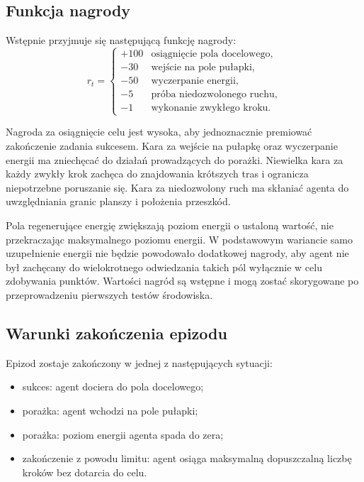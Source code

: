 \documentclass[12pt]{article}
\begin{document}
\subsection{Funkcja nagrody}

Wstępnie przyjmuje się następującą funkcję nagrody:
\[
r_t =
\begin{cases}
+100 & \text{osiągnięcie pola docelowego},\\
-30 & \text{wejście na pole pułapki},\\
-50 & \text{wyczerpanie energii},\\
-5 & \text{próba niedozwolonego ruchu},\\
-1 & \text{wykonanie zwykłego kroku}.
\end{cases}
\]

Nagroda za osiągnięcie celu jest wysoka, aby jednoznacznie premiować zakończenie zadania sukcesem. Kara za wejście na pułapkę oraz wyczerpanie energii ma zniechęcać do działań prowadzących do porażki. Niewielka kara za każdy zwykły krok zachęca do znajdowania krótszych tras i ogranicza niepotrzebne poruszanie się. Kara za niedozwolony ruch ma skłaniać agenta do uwzględniania granic planszy i położenia przeszkód.

Pola regenerujące energię zwiększają poziom energii o ustaloną wartość, nie przekraczając maksymalnego poziomu energii. W podstawowym wariancie samo uzupełnienie energii nie będzie powodowało dodatkowej nagrody, aby agent nie był zachęcany do wielokrotnego odwiedzania takich pól wyłącznie w celu zdobywania punktów. Wartości nagród są wstępne i mogą zostać skorygowane po przeprowadzeniu pierwszych testów środowiska.

\subsection{Warunki zakończenia epizodu}

Epizod zostaje zakończony w jednej z następujących sytuacji:
\begin{itemize}
    \item sukces: agent dociera do pola docelowego;
    \item porażka: agent wchodzi na pole pułapki;
    \item porażka: poziom energii agenta spada do zera;
    \item zakończenie z powodu limitu: agent osiąga maksymalną dopuszczalną liczbę kroków bez dotarcia do celu.
\end{itemize}
\end{document}
